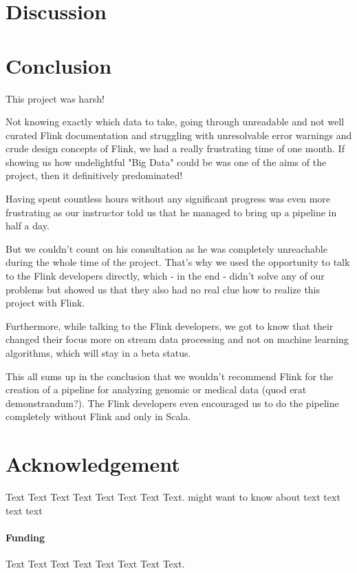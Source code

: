 \documentclass{bioinfo}
\begin{document}
\section{Discussion}






\section{Conclusion}


This project was harsh!

Not knowing exactly which data to take, going through unreadable and not well curated Flink documentation and struggling with unresolvable error warnings and crude design concepts of Flink, we had a really frustrating time of one month.
If showing us how undelightful "Big Data" could be was one of the aims of the project, then it definitively predominated!

Having spent countless hours without any significant progress was even more frustrating as our instructor told us that he managed to bring up a pipeline in half a day.

But we couldn't count on his consultation as he was completely unreachable during the whole time of the project. That's why we used the opportunity to talk to the Flink developers directly, which - in the end - didn't solve any of our problems but showed us that they also had no real clue how to realize this project with Flink.

Furthermore, while talking to the Flink developers, we got to know that their changed their focus more on stream data processing and not on machine learning algorithms, which will stay in a beta status.

This all sums up in the conclusion that we wouldn't recommend Flink for the creation of a pipeline for analyzing genomic or medical data (quod erat demonstrandum?). The Flink developers even encouraged us to do the pipeline completely without Flink and only in Scala.



\section*{Acknowledgement}
Text Text Text Text Text Text  Text Text.  \citealp{Boffelli03} might want to know about  text text text text

\paragraph{Funding\textcolon} Text Text Text Text Text Text  Text Text.
\end{document}

